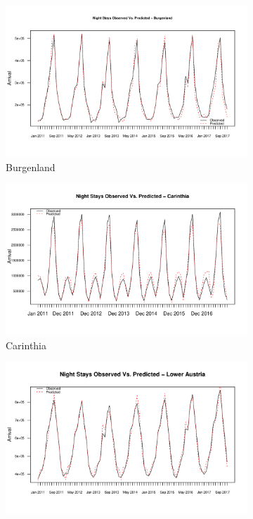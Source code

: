 \documentclass[a4paper,reqno,]{article}
\begin{document}
\begin{figure}[H]
  \centering
  \begin{subfigure}[b]{0.32\linewidth}
    \includegraphics[width=\linewidth]{images/SVR/BurgenlandSpaceTimeSVR.pdf}
    \caption{Burgenland}
  \end{subfigure}
  \begin{subfigure}[b]{0.32\linewidth}
    \includegraphics[width=\linewidth]{images/SVR/CarinthiaSpaceTimeSVR.pdf}
    \caption{Carinthia}
  \end{subfigure}
  \begin{subfigure}[b]{0.32\linewidth}
    \includegraphics[width=\linewidth]{images/SVR/LowerAustriaSpaceTimeSVR.pdf}

\end{subfigure}
\end{figure}
\end{document}
